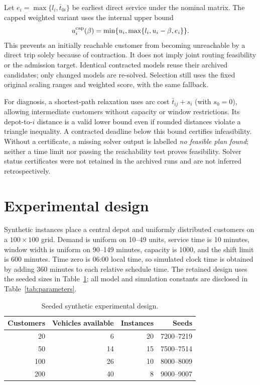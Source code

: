 \documentclass[11pt,a4paper]{article}
\begin{document}
Let $e_i=\max\{l_i,\bar t_{0i}\}$ be earliest direct service under the nominal
matrix. The capped weighted variant uses the internal upper bound
\begin{equation}
 u_i^{\rm cap}(\beta)=\min\{u_i,\max\{l_i,u_i-\beta,e_i\}\}.
\end{equation}
This prevents an initially reachable customer from becoming unreachable by a
direct trip solely because of contraction. It does not imply joint routing
feasibility or the admission target. Identical contracted models reuse their
archived candidates; only changed models are re-solved. Selection still uses
the fixed original scaling ranges and weighted score, with the same fallback.

For diagnosis, a shortest-path relaxation uses arc cost
$\bar t_{ij}+s_i$ (with $s_0=0$), allowing intermediate customers without
capacity or window restrictions. Its depot-to-$i$ distance is a valid lower
bound even if rounded distances violate a triangle inequality. A contracted
deadline below this bound certifies infeasibility. Without a certificate, a
missing solver output is labelled \emph{no feasible plan found}; neither a
time limit nor passing the reachability test proves feasibility. Solver
status certificates were not retained in the archived runs and are not
inferred retrospectively.

\section{Experimental design}

Synthetic instances place a central depot and uniformly distributed customers
on a $100\times100$ grid. Demand is uniform on 10--49 units, service time is
10 minutes, window width is uniform on 90--149 minutes, capacity is 1000, and
the shift limit is 600 minutes. Time zero is 06:00 local time, so simulated
clock time is obtained by adding 360 minutes to each relative schedule time.
The retained design uses the seeded sizes in Table~\ref{tab:design}; all model
and simulation constants are disclosed in Table~\ref{tab:parameters}.

\begin{table}[ht]
\centering
\caption{Seeded synthetic experimental design.}
\label{tab:design}
\begin{tabular}{rrrr}
\toprule
Customers & Vehicles available & Instances & Seeds\\
\midrule
20  & 6  & 20 & 7200--7219\\
50  & 14 & 15 & 7500--7514\\
100 & 26 & 10 & 8000--8009\\
200 & 40 & 8  & 9000--9007\\
\bottomrule
\end{tabular}
\end{table}
\end{document}
